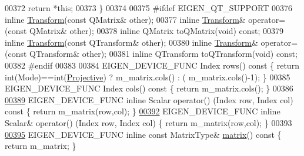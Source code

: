\begin{DoxyCode}
00372     \textcolor{keywordflow}{return} *\textcolor{keyword}{this};
00373   \}
00374 
00375 \textcolor{preprocessor}{  #ifdef EIGEN\_QT\_SUPPORT}
00376   \textcolor{keyword}{inline} \hyperlink{group___geometry___module_class_eigen_1_1_transform}{Transform}(\textcolor{keyword}{const} QMatrix& other);
00377   \textcolor{keyword}{inline} \hyperlink{group___geometry___module_class_eigen_1_1_transform}{Transform}& operator=(\textcolor{keyword}{const} QMatrix& other);
00378   \textcolor{keyword}{inline} QMatrix toQMatrix(\textcolor{keywordtype}{void}) \textcolor{keyword}{const};
00379   \textcolor{keyword}{inline} \hyperlink{group___geometry___module_class_eigen_1_1_transform}{Transform}(\textcolor{keyword}{const} QTransform& other);
00380   \textcolor{keyword}{inline} \hyperlink{group___geometry___module_class_eigen_1_1_transform}{Transform}& operator=(\textcolor{keyword}{const} QTransform& other);
00381   \textcolor{keyword}{inline} QTransform toQTransform(\textcolor{keywordtype}{void}) \textcolor{keyword}{const};
00382 \textcolor{preprocessor}{  #endif}
00383   
00384   EIGEN\_DEVICE\_FUNC Index rows()\textcolor{keyword}{ const }\{ \textcolor{keywordflow}{return} int(Mode)==int(\hyperlink{group__enums_ggaee59a86102f150923b0cac6d4ff05107aead6a2de12a17aaa4f5c523215dfccad}{Projective}) ? m\_matrix.cols() : (
      m\_matrix.cols()-1); \}
00385   EIGEN\_DEVICE\_FUNC Index cols()\textcolor{keyword}{ const }\{ \textcolor{keywordflow}{return} m\_matrix.cols(); \}
00386 
\hyperlink{group___geometry___module_aa0a930a85c51566fe06d281da85d1a4a}{00389}   EIGEN\_DEVICE\_FUNC \textcolor{keyword}{inline} Scalar operator() (Index row, Index col)\textcolor{keyword}{ const }\{ \textcolor{keywordflow}{return} m\_matrix(row,col); \}
\hyperlink{group___geometry___module_ab66b426ef3ebf955d4f925cbcee34293}{00392}   EIGEN\_DEVICE\_FUNC \textcolor{keyword}{inline} Scalar& operator() (Index row, Index col) \{ \textcolor{keywordflow}{return} m\_matrix(row,col); \}
00393 
\hyperlink{group___geometry___module_aec8168000a88a807130d41020af98d47}{00395}   EIGEN\_DEVICE\_FUNC \textcolor{keyword}{inline} \textcolor{keyword}{const} MatrixType& \hyperlink{group___geometry___module_aec8168000a88a807130d41020af98d47}{matrix}()\textcolor{keyword}{ const }\{ \textcolor{keywordflow}{return} m\_matrix; \}

\end{DoxyCode}
